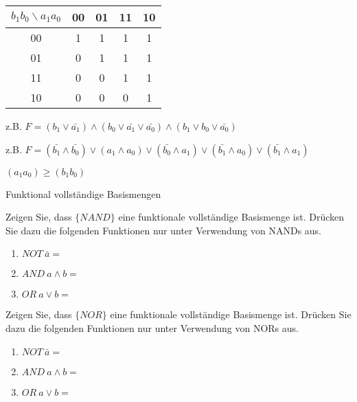 \documentclass{exercisesheet}
\begin{document}
\begin{solution**}
  \item
  \begin{tabular}{c|cccc}
    $b_1b_0 \backslash a_1a_0$ & 00 & 01 & 11 & 10 \\
    \hline
    00                         & 1  & 1  & 1  & 1  \\
    01                         & 0  & 1  & 1  & 1  \\
    11                         & 0  & 0  & 1  & 1  \\
    10                         & 0  & 0  & 0  & 1  \\
  \end{tabular}
  \item z.B. $F = (b_1 \lor \bar{a_1}) \land (b_0\lor \bar{a_1}\lor \bar{a_0}) \land (b_1\lor b_0\lor\bar{a_0})$
  \item z.B. $F = (\bar{b_1}\land\bar{b_0}) \lor (a_1\land a_0) \lor (\bar{b_0}\land a_1) \lor (\bar{b_1}\land a_0)\lor(\bar{b_1}\land a_1)$
  \item $(a_1a_0) \geq (b_1b_0)$
\end{solution**}

\begin{exercise**}{Funktional vollständige Basismengen}
  \item Zeigen Sie, dass $\{NAND\}$ eine funktionale vollständige Basismenge ist. Drücken Sie dazu die folgenden Funktionen nur unter Verwendung von NANDs aus.
  \begin{enumerate}
    \item $NOT\ \bar{a} = $
    \item $AND\ a \land b = $
    \item $OR\ a \lor b = $
  \end{enumerate}
  \item Zeigen Sie, dass $\{NOR\}$ eine funktionale vollständige Basismenge ist. Drücken Sie dazu die folgenden Funktionen nur unter Verwendung von NORs aus.
  \begin{enumerate}
    \item $NOT\ \bar{a} = $
    \item $AND\ a \land b = $
    \item $OR\ a \lor b = $
  \end{enumerate}
\end{exercise**}
\end{document}

